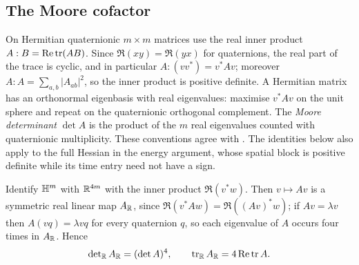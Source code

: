 \subsection{The Moore cofactor}\label{ssec:moore}
On Hermitian quaternionic $m\times m$ matrices use the real inner product $A:B=\operatorname{Re}\operatorname{tr}(AB)$.
Since $\Re(xy)=\Re(yx)$ for quaternions, the real part of the trace is cyclic, and in particular
$A:(vv^*)=v^*Av$; moreover $A:A=\sum_{a,b}|A_{ab}|^2$, so the inner product is positive
definite. A Hermitian matrix has an orthonormal eigenbasis with real eigenvalues: maximise
$v^*Av$ on the unit sphere and repeat on the quaternionic orthogonal complement. The
\emph{Moore determinant} $\det A$ is the product of the $m$ real eigenvalues counted with
quaternionic multiplicity. These conventions agree with \cite[\S1.1, Theorems 1.1.8 and
1.1.9]{Ale03a}. The identities below also apply to the full Hessian in the energy argument,
whose spatial block is positive definite while its time entry need not have a sign.

Identify $\mathbb{H}^m$ with $\mathbb{R}^{4m}$ with the inner product $\Re(v^*w)$. Then $v\mapsto Av$ is a
symmetric real linear map $A_{\mathbb{R}}$, since $\Re(v^*Aw)=\Re((Av)^*w)$; if $Av=\lambda v$ then
$A(vq)=\lambda vq$ for every quaternion $q$, so each eigenvalue of $A$ occurs four times in
$A_{\mathbb{R}}$. Hence
\begin{equation}\label{eq:realrep}
\det\nolimits_{\mathbb{R}}A_{\mathbb{R}}=(\det A)^4,\qquad\operatorname{tr}_{\mathbb{R}}A_{\mathbb{R}}=4\operatorname{Re}\operatorname{tr} A .
\end{equation}

